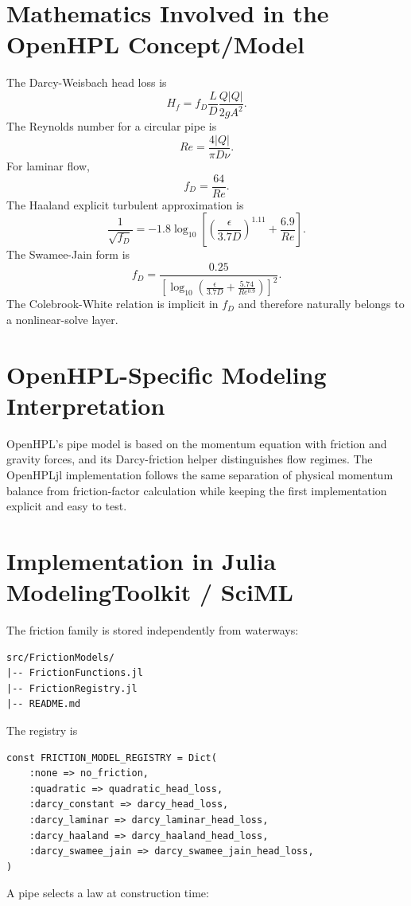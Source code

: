 \documentclass[11pt,a4paper]{article}
\begin{document}
\section{Mathematics Involved in the OpenHPL Concept/Model}
The Darcy-Weisbach head loss is
\[
\boxed{H_f=f_D\frac{L}{D}\frac{Q|Q|}{2gA^2}}.
\]
The Reynolds number for a circular pipe is
\[
Re=\frac{4|Q|}{\pi D\nu}.
\]
For laminar flow,
\[
\boxed{f_D=\frac{64}{Re}}.
\]
The Haaland explicit turbulent approximation is
\[
\frac{1}{\sqrt{f_D}}
=
-1.8\log_{10}\left[
\left(\frac{\epsilon}{3.7D}\right)^{1.11}
+
\frac{6.9}{Re}
\right].
\]
The Swamee-Jain form is
\[
f_D=
\frac{0.25}{
\left[
\log_{10}\left(
\frac{\epsilon}{3.7D}
+
\frac{5.74}{Re^{0.9}}
\right)
\right]^2
}.
\]
The Colebrook-White relation is implicit in $f_D$ and therefore naturally belongs to a nonlinear-solve layer.

\section{OpenHPL-Specific Modeling Interpretation}
OpenHPL's pipe model is based on the momentum equation with friction and gravity forces, and its Darcy-friction helper distinguishes flow regimes. The OpenHPLjl implementation follows the same separation of physical momentum balance from friction-factor calculation while keeping the first implementation explicit and easy to test.

\section{Implementation in Julia ModelingToolkit / SciML}
The friction family is stored independently from waterways:

\begin{lstlisting}
src/FrictionModels/
|-- FrictionFunctions.jl
|-- FrictionRegistry.jl
|-- README.md
\end{lstlisting}

The registry is

\begin{lstlisting}
const FRICTION_MODEL_REGISTRY = Dict(
    :none => no_friction,
    :quadratic => quadratic_head_loss,
    :darcy_constant => darcy_head_loss,
    :darcy_laminar => darcy_laminar_head_loss,
    :darcy_haaland => darcy_haaland_head_loss,
    :darcy_swamee_jain => darcy_swamee_jain_head_loss,
)
\end{lstlisting}

A pipe selects a law at construction time:
\end{document}
